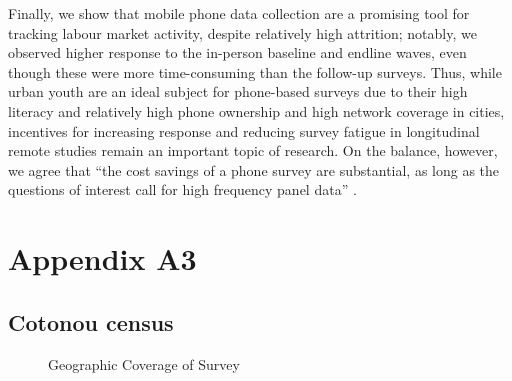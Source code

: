 \documentclass[
  a4paper, twoside, 12pt]{book}
\begin{document}
Finally, we show that mobile phone data collection are a promising tool for tracking labour market activity, despite relatively high attrition; notably, we observed higher response to the in-person baseline and endline waves, even though these were more time-consuming than the follow-up surveys. Thus, while urban youth are an ideal subject for phone-based surveys due to their high literacy and relatively high phone ownership and high network coverage in cities, incentives for increasing response and reducing survey fatigue in longitudinal remote studies remain an important topic of research. On the balance, however, we agree that ``the cost savings of a phone survey are substantial, as long as the questions of interest call for high frequency panel data'' \autocite{dillon2012}.

\newpage
{}
\printbibliography[segment=\therefsegment,heading=subbibintoc,title={References}]

\newpage

\setcounter{figure}{0}
\renewcommand{\thefigure}{A3.\arabic{figure}}
\setcounter{table}{0}
\renewcommand{\thetable}{A3.\arabic{table}}
\setcounter{section}{0}
\renewcommand{\thesection}{\Alph{section}2}
\renewcommand{\thesubsection}{A3.\arabic{subsection}}

\hypertarget{survey-appendix-a}{%
\section*{Appendix A3}\label{survey-appendix-a}}


\hypertarget{survey-census}{%
\subsection*{Cotonou census}\label{survey-census}}


\begin{figure}[H] \caption{\label{fig:litt} Geographic Coverage of Survey}
\centering
{}
\end{figure}
\end{document}
